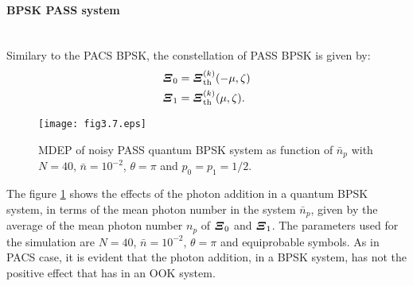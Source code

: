         \paragraph{BPSK PASS system}\mbox{}\\
        Similary to the PACS BPSK, the constellation of PASS BPSK is given by:
        \begin{subequations}
            \begin{align}
                \Operator{\varXi}_0 &= \Operator{\varXi}_{\mathrm{th}}^{(k)}(-\mu,\zeta)\\
                \Operator{\varXi}_1 &= \Operator{\varXi}_{\mathrm{th}}^{(k)}(\mu,\zeta).
            \end{align}
        \end{subequations}
        \begin{figure}[t]
            \begin{center}
                \texttt{[image: fig3.7.eps]}
                \caption{MDEP of noisy PASS quantum BPSK system as function of $\bar{n}_p$ with
                $N=40$, $\bar{n}=10^{-2}$, $\theta=\pi$ and $p_0=p_1=1/2$.}
                \label{fig:3.7}
            \end{center}
        \end{figure}
        The figure \ref{fig:3.7} shows the effects of the photon addition in a quantum BPSK
        system, in terms of the mean photon number in the system $\bar{n}_p$, given by the average of 
        the mean photon number $n_p$ of $\Operator{\varXi}_0$ and $\Operator{\varXi}_1$. The parameters used
        for the simulation are $N=40$, $\bar{n}=10^{-2}$, $\theta=\pi$ and equiprobable symbols.
        As in PACS case, it is evident that the photon addition, in a BPSK system, has not
        the positive effect that has in an OOK system.